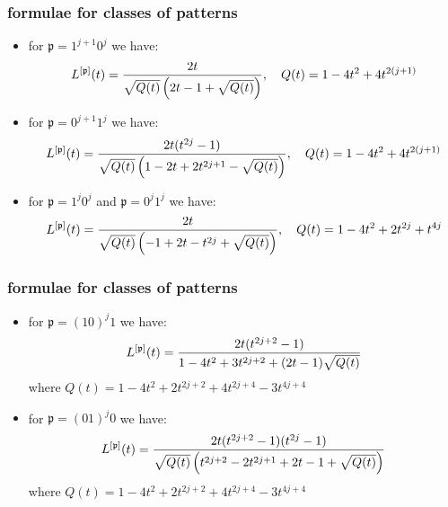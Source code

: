 \documentclass{beamer}
\begin{document}
\begin{frame}\frametitle{formulae for classes of patterns}
{\small
\begin{itemize}

\item for $\mathfrak{p}=1^{j+1}0^j$ we have:
$$ L^{[\mathfrak{p}]}(t)={2t \over \sqrt{Q(t)}\left(2t-1+ \sqrt{Q(t)}\right) }, \quad Q(t)=1-4t^2+4t^{2(j+1)}$$

\item for $\mathfrak{p}=0^{j+1}1^j$ we have:
$$ L^{[\mathfrak{p}]}(t)={2t(t^{2j}-1) \over \sqrt{Q(t)} \left(1-2t+2t^{2j+1} -\sqrt{Q(t)}\right)}, \quad Q(t)=1-4t^2+4t^{2(j+1)}$$

\item for $\mathfrak{p}=1^{j}0^j$ and $\mathfrak{p}=0^{j}1^j$ we have:
$$ L^{[\mathfrak{p}]}(t)={2 t \over \sqrt{Q(t)} \left(-1+2t-t^{2j}+\sqrt{Q(t)}  \right)}, \quad Q(t)=1-4t^{2}+2t^{2j}+t^{4j}$$

\end{itemize}
}
\end{frame}

\begin{frame}\frametitle{formulae for classes of patterns}
{\small
\begin{itemize}

\item for $\mathfrak{p}=(10)^j1$ we have:
$$ L^{[\mathfrak{p}]}(t)={2 t (t^{2j+2}-1)\over 1-4t^2+3t^{2j+2}+(2t-1)\sqrt{Q(t)} }$$
where $Q(t)=1-4t^2+2t^{2j+2}+4t^{2j+4}-3t^{4j+4}$

\item for $\mathfrak{p}=(01)^j0$ we have:
$$ L^{[\mathfrak{p}]}(t)={2 t (t^{2j+2}-1)(t^{2j}-1)\over  \sqrt{Q(t)} \left(t^{2j+2}-2t^{2j+1}+2t-1+ \sqrt{Q(t)}\right) }$$
where $Q(t)={1-4t^2+2t^{2j+2}+4t^{2j+4}-3t^{4j+4}}$

\end{itemize}
}
\end{frame}
\end{document}
